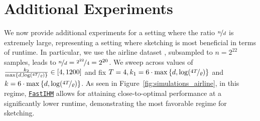 \documentclass[11pt]{article}
\theoremstyle{definition}
\theoremstyle{plain}
\providecommand{\figureref}[1]{Figure~\ref{#1}}
\newcommand{\FastIHM}{\hyperref[alg:private_fast_hessian_sketch]{\texttt{FastIHM}}\xspace}
\begin{document}
\section{Additional Experiments}
\label{app:additional_exps}
We now provide additional experiments for a setting where the ratio $\nicefrac{n}{d}$ is extremely large, representing a setting where sketching is most beneficial in terms of runtime. In particular, we use the airline dataset \citep{openml_airlines_depdelay_10m_42728}, subsampled to $n=2^{22}$ samples, leads to $\nicefrac{n}{d} = \nicefrac{2^{22}}{4} = 2^{20}$. We sweep across values of $\frac{k_2}{\max\left\{d, \log(\nicefrac{4T}{\varrho})\right\}} \in [4, 1200]$ and fix $T = 4, k_1 = 6\cdot \max\left\{d, \log(\nicefrac{4T}{\varrho})\right\}$ and $k = 6\cdot \max\left\{d, \log(\nicefrac{4T}{\varrho})\right\}$. As seen in \figureref{fig:simulations_airline}, in this regime, \FastIHM allows for attaining close-to-optimal performance at a significantly lower runtime, demonstrating the most favorable regime for sketching.  
\end{document}
